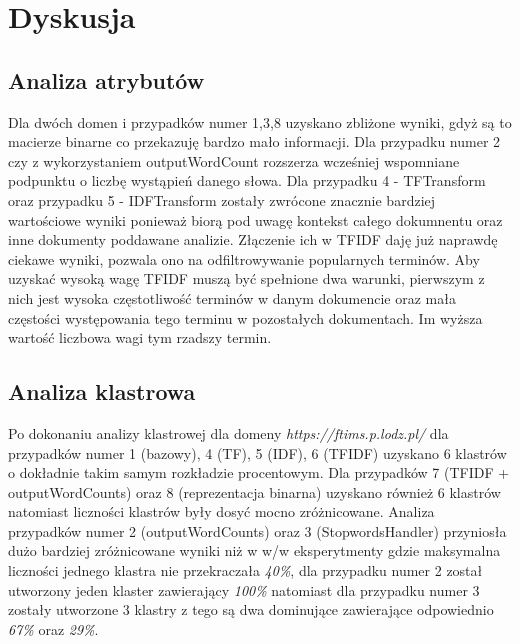 \documentclass{classrep}
\begin{document}
    \section{Dyskusja} {

        \subsection{Analiza atrybutów} {
            Dla dwóch domen i przypadków numer 1,3,8 uzyskano zbliżone wyniki, gdyż są
            to macierze binarne co przekazuję bardzo mało informacji. Dla przypadku
            numer 2 czy z wykorzystaniem outputWordCount rozszerza wcześniej wspomniane
            podpunktu o liczbę wystąpień danego słowa. Dla przypadku 4 - TFTransform
            oraz przypadku 5 - IDFTransform zostały zwrócone znacznie bardziej
            wartościowe wyniki ponieważ biorą pod uwagę kontekst całego dokumnentu oraz
            inne dokumenty poddawane analizie. Złączenie ich w TFIDF daję już naprawdę
            ciekawe wyniki, pozwala ono na odfiltrowywanie popularnych terminów. Aby
            uzyskać wysoką wagę TFIDF muszą być spełnione dwa warunki, pierwszym z nich
            jest wysoka częstotliwość terminów w danym dokumencie oraz mała częstości
            występowania tego terminu w pozostałych dokumentach. Im wyższa wartość
            liczbowa wagi tym rzadszy termin.
        }

        \subsection{Analiza klastrowa} {
            Po dokonaniu analizy klastrowej dla domeny \textit{https://ftims.p.lodz.pl/}
            dla przypadków numer 1 (bazowy), 4 (TF), 5 (IDF), 6 (TFIDF) uzyskano 6
            klastrów o dokładnie takim samym rozkładzie procentowym. Dla przypadków
            7 (TFIDF + outputWordCounts) oraz 8 (reprezentacja binarna) uzyskano również
            6 klastrów natomiast liczności klastrów były dosyć mocno zróżnicowane.
            Analiza przypadków numer 2 (outputWordCounts) oraz 3 (StopwordsHandler)
            przyniosła dużo bardziej zróżnicowane wyniki niż w w/w eksperytmenty gdzie
            maksymalna liczności jednego klastra nie przekraczała \textit{40\%}, dla
            przypadku numer 2 został utworzony jeden klaster zawierający \textit{100\%}
            natomiast dla przypadku numer 3 zostały utworzone 3 klastry z tego są dwa
            dominujące zawierające odpowiednio \textit{67\%} oraz \textit{29\%}.

}}
\end{document}
